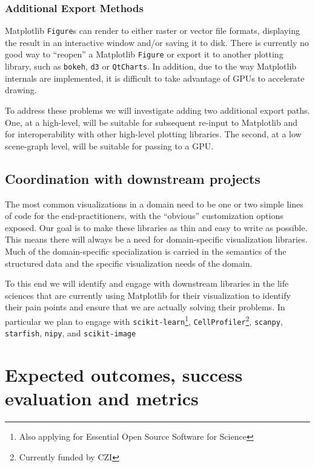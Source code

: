 \documentclass[11pt]{article}  %
\begin{document}
\subsubsection{Additional Export Methods}

Matplotlib \texttt{Figure}s can render to either raster or vector
file formats, displaying the result in an interactive window and/or
saving it to disk. There is
currently no good way to ``reopen'' a Matplotlib \texttt{Figure} or
export it to another plotting library, such as \texttt{bokeh},
\texttt{d3} or \texttt{QtCharts}.  In addition, due to the way Matplotlib
internals are implemented, it is difficult to take advantage of GPUs to
accelerate drawing.

To address these problems we will investigate adding two additional
export paths.  One, at a high-level, will be suitable for subsequent re-input
to Matplotlib
and for interoperability with other high-level plotting
libraries. The second, at a low scene-graph level, will be suitable for passing
to a GPU.


\subsection{Coordination with downstream projects}


The most common visualizations in a domain need to be one or two
simple lines of code for the end-practitioners, with the ``obvious''
customization options exposed.  Our goal is to make these libraries
as thin and easy to write as possible.  This means there will always
be a need for domain-specific visualization libraries.  Much of the
domain-specific specialization is carried in the semantics of the
structured data and the specific visualization needs of the domain.

To this end we will identify and engage with downstream libraries in
the life sciences that are currently using Matplotlib for their
visualization to identify their pain points and ensure that we are
actually solving their problems.  In particular we plan to engage with
\texttt{scikit-learn}\footnote{Also applying for Essential Open Source
Software for Science}, \texttt{CellProfiler}\footnote{Currently funded
by CZI\label{f:czi}}, \texttt{scanpy},
\texttt{starfish}, \texttt{nipy}, and
\texttt{scikit-image}


\section{Expected outcomes, success evaluation and metrics}
\end{document}
